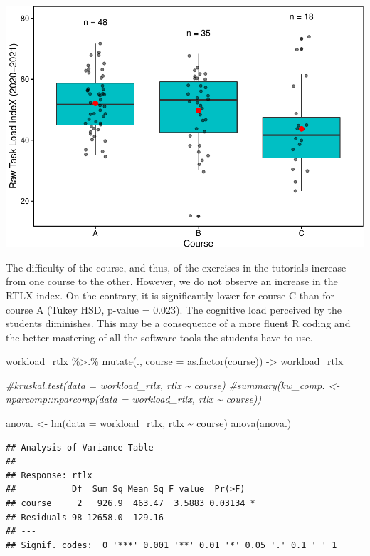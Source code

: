 \documentclass[
]{article}
\newenvironment{Shaded}{\begin{snugshade}}{\end{snugshade}}
\newcommand{\AttributeTok}[1]{\textcolor[rgb]{0.77,0.63,0.00}{#1}}
\newcommand{\CommentTok}[1]{\textcolor[rgb]{0.56,0.35,0.01}{\textit{#1}}}
\newcommand{\FunctionTok}[1]{\textcolor[rgb]{0.00,0.00,0.00}{#1}}
\newcommand{\NormalTok}[1]{#1}
\newcommand{\OtherTok}[1]{\textcolor[rgb]{0.56,0.35,0.01}{#1}}
\newcommand{\SpecialCharTok}[1]{\textcolor[rgb]{0.00,0.00,0.00}{#1}}
\begin{document}
\includegraphics{teaching_data_science_files/figure-latex/unnamed-chunk-6-1.pdf}

The difficulty of the course, and thus, of the exercises in the
tutorials increase from one course to the other. However, we do not
observe an increase in the RTLX index. On the contrary, it is
significantly lower for course C than for course A (Tukey HSD, p-value =
0.023). The cognitive load perceived by the students diminishes. This
may be a consequence of a more fluent R coding and the better mastering
of all the software tools the students have to use.

\begin{Shaded}
\begin{Highlighting}[]
\NormalTok{workload\_rtlx }\SpecialCharTok{\%\textgreater{}.\%}
  \FunctionTok{mutate}\NormalTok{(., }\AttributeTok{course =} \FunctionTok{as.factor}\NormalTok{(course)) }\OtherTok{{-}\textgreater{}}\NormalTok{ workload\_rtlx}

\CommentTok{\#kruskal.test(data = workload\_rtlx, rtlx \textasciitilde{} course)}
\CommentTok{\#summary(kw\_comp. \textless{}{-} nparcomp::nparcomp(data = workload\_rtlx, rtlx \textasciitilde{} course))}

\NormalTok{anova. }\OtherTok{\textless{}{-}} \FunctionTok{lm}\NormalTok{(}\AttributeTok{data =}\NormalTok{ workload\_rtlx, rtlx }\SpecialCharTok{\textasciitilde{}}\NormalTok{ course)}
\FunctionTok{anova}\NormalTok{(anova.)}
\end{Highlighting}
\end{Shaded}

\begin{verbatim}
## Analysis of Variance Table
## 
## Response: rtlx
##           Df  Sum Sq Mean Sq F value  Pr(>F)  
## course     2   926.9  463.47  3.5883 0.03134 *
## Residuals 98 12658.0  129.16                  
## ---
## Signif. codes:  0 '***' 0.001 '**' 0.01 '*' 0.05 '.' 0.1 ' ' 1
\end{verbatim}
\end{document}
